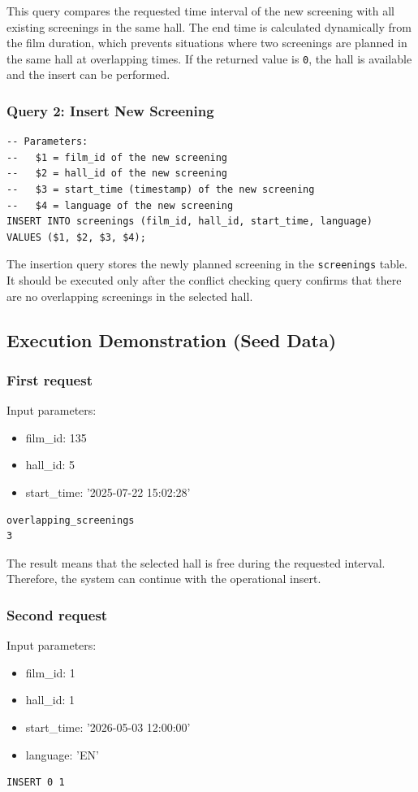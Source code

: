 \documentclass[11pt, a4paper]{article}
\begin{document}
This query compares the requested time interval of the new screening with all existing screenings in the same hall.
The end time is calculated dynamically from the film duration, which prevents situations where two screenings are planned in the same hall at overlapping times.
If the returned value is \texttt{0}, the hall is available and the insert can be performed.

\subsubsection{Query 2: Insert New Screening}
\begin{lstlisting}
-- Parameters:
--   $1 = film_id of the new screening
--   $2 = hall_id of the new screening
--   $3 = start_time (timestamp) of the new screening
--   $4 = language of the new screening
INSERT INTO screenings (film_id, hall_id, start_time, language)
VALUES ($1, $2, $3, $4);
\end{lstlisting}

The insertion query stores the newly planned screening in the \texttt{screenings} table.
It should be executed only after the conflict checking query confirms that there are no overlapping screenings in the selected hall.

\subsection{Execution Demonstration (Seed Data)}
\subsubsection{First request}
Input parameters:
\begin{itemize}
    \item film\_id: 135
    \item hall\_id: 5
    \item start\_time: '2025-07-22 15:02:28'
\end{itemize}
\begin{lstlisting}
overlapping_screenings
3
\end{lstlisting}

The result means that the selected hall is free during the requested interval.
Therefore, the system can continue with the operational insert.

\subsubsection{Second request}
Input parameters:
\begin{itemize}
    \item film\_id: 1
    \item hall\_id: 1
    \item start\_time: '2026-05-03 12:00:00'
    \item language: 'EN'
\end{itemize}
\begin{lstlisting}
INSERT 0 1
\end{lstlisting}
\end{document}

